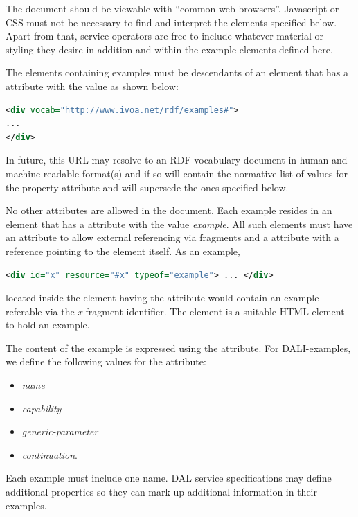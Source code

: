 \documentclass[11pt,letter]{ivoa}
\begin{document}
The document should be viewable with ``common web browsers''. Javascript or CSS 
must not be necessary to find and interpret the elements specified below.  Apart 
from that, service operators are free to include whatever material or styling 
they desire in addition and within the example elements defined here.

The elements containing examples must be descendants of an element that has a 
 attribute with the value as shown below:

\begin{lstlisting}[language=XML]
<div vocab="http://www.ivoa.net/rdf/examples#">
...
</div>
\end{lstlisting}

In future, this URL may resolve to an RDF vocabulary document in human and 
machine-readable format(s) and if so will contain the normative list of values 
for the property attribute and will supersede the ones specified below.

No other  attributes are allowed in the document. Each example resides in 
an element that has a  attribute with the value
\emph{example}. All such elements 
must have an  attribute to allow external referencing via fragments and a 
 attribute with a reference pointing to the element itself. As an 
example,

\begin{lstlisting}[language=XML]
<div id="x" resource="#x" typeof="example"> ... </div>
\end{lstlisting}

\noindent located inside the element having the  attribute would 
contain an example referable via the \emph{x} fragment identifier. The
 element is 
a suitable HTML element to hold an example.

The content of the example is expressed using the  attribute. For 
DALI-examples, we define the following values for the  attribute: 

\begin{itemize}
\item \emph{name}
\item \emph{capability}
\item \emph{generic-parameter}
\item \emph{continuation}.
\end{itemize}

Each example must include one 
name.  DAL service specifications may define additional 
properties so they can mark up additional information in their examples.
\end{document}

